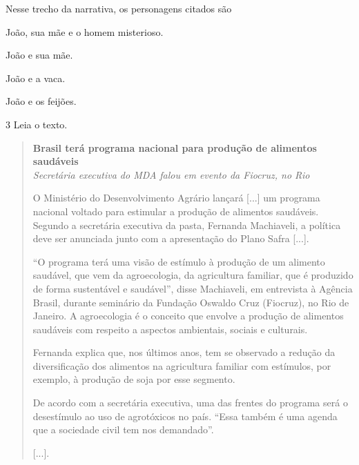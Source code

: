 \pagebreak
Nesse trecho da narrativa, os personagens citados são

\begin{minipage}{.5\textwidth}
\begin{escolha}
\item João, sua mãe e o homem misterioso.

\item João e sua mãe.

\item João e a vaca.

\item João e os feijões.
\end{escolha}
\end{minipage}

\num{3} Leia o texto.

\begin{quote}
\textbf{Brasil terá programa nacional para produção de alimentos saudáveis}\\
\textit{Secretária executiva do MDA falou em evento da Fiocruz, no Rio}

O Ministério do Desenvolvimento Agrário lançará {[}...{]} um programa nacional voltado para estimular a produção de alimentos saudáveis. Segundo a secretária executiva da pasta, Fernanda Machiaveli, a política deve ser anunciada junto com a apresentação do Plano Safra {[}...{]}.

“O programa terá uma visão de estímulo à produção de um alimento saudável, que vem da agroecologia, da agricultura familiar, que é produzido de forma sustentável e saudável”, disse Machiaveli, em entrevista à Agência Brasil, durante seminário da Fundação Oswaldo Cruz (Fiocruz), no Rio de Janeiro. A agroecologia é o conceito que envolve a produção de alimentos saudáveis com respeito a aspectos ambientais, sociais e culturais.

Fernanda explica que, nos últimos anos, tem se observado a redução da diversificação dos alimentos na agricultura familiar com estímulos, por exemplo, à produção de soja por esse segmento.

De acordo com a secretária executiva, uma das frentes do programa será o desestímulo ao uso de agrotóxicos no país. “Essa também é uma agenda que a sociedade civil tem nos demandado”.

{[}...{]}.

\end{quote}

